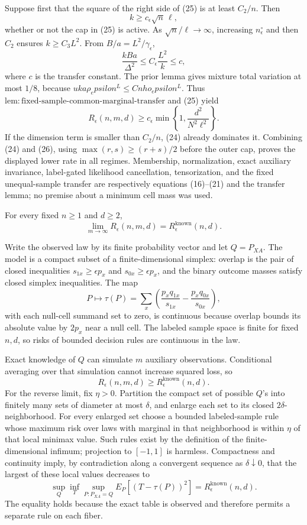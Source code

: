 Suppose first that the square of the right side of (25) is at least \(C_2/n\).  Then
\[
 k\ge c_\epsilon\sqrt n\,\ell,
\]
whether or not the cap in (25) is active.  As \(\sqrt n/\ell\to\infty\), increasing \(n_\epsilon^\circ\) and then \(C_2\) ensures \(k\ge C_3L^2\).  From \(B/a=L^2/\gamma_\epsilon\),
\[
 \frac{kBa}{\Delta^2}\le C_\epsilon\frac{L^2}{k}\le c,
\]
where \(c\) is the transfer constant.  The prior lemma gives mixture total variation at most \(1/8\), because \(uka\rho_epsilon^L\le Cn
ho_epsilon^L\).  Thus \(\mathrm{lem:fixed\mbox{-}sample\mbox{-}common\mbox{-}marginal\mbox{-}transfer}\) and (25) yield
\[
 R_\epsilon(n,m,d)\ge c_\epsilon\min\!\left\{1,\frac{d^2}{N^2\ell^2}\right\}. \tag{26}
\]
If the dimension term is smaller than \(C_2/n\), (24) already dominates it.  Combining (24) and (26), using \(\max(r,s)\ge(r+s)/2\) before the outer cap, proves the displayed lower rate in all regimes.  Membership, normalization, exact auxiliary invariance, label-gated likelihood cancellation, tensorization, and the fixed unequal-sample transfer are respectively equations (16)--(21) and the transfer lemma; no premise about a minimum cell mass was used.

For every fixed \(n\ge1\) and \(d\ge2\),
\[
 \lim_{m\to\infty}R_\epsilon(n,m,d)=R_\epsilon^{\mathrm{known}}(n,d).
\]

Write the observed law by its finite probability vector and let \(Q=P_{XA}\).  The model is a compact subset of a finite-dimensional simplex: overlap is the pair of closed inequalities \(s_{1x}\ge\epsilon p_x\) and \(s_{0x}\ge\epsilon p_x\), and the binary outcome masses satisfy closed simplex inequalities.  The map
\[
 P\longmapsto\tau(P)=\sum_x\left(\frac{p_xq_{1x}}{s_{1x}}-\frac{p_xq_{0x}}{s_{0x}}\right),
\]
with each null-cell summand set to zero, is continuous because overlap bounds its absolute value by \(2p_x\) near a null cell.  The labeled sample space is finite for fixed \(n,d\), so risks of bounded decision rules are continuous in the law.

Exact knowledge of \(Q\) can simulate \(m\) auxiliary observations.  Conditional averaging over that simulation cannot increase squared loss, so
\[
 R_\epsilon(n,m,d)\ge R_\epsilon^{\mathrm{known}}(n,d). \tag{27}
\]
For the reverse limit, fix \(\eta>0\).  Partition the compact set of possible \(Q\)'s into finitely many sets of diameter at most \(\delta\), and enlarge each set to its closed \(2\delta\)-neighborhood.  For every enlarged set choose a bounded labeled-sample rule whose maximum risk over laws with marginal in that neighborhood is within \(\eta\) of that local minimax value.  Such rules exist by the definition of the finite-dimensional infimum; projection to \([-1,1]\) is harmless.  Compactness and continuity imply, by contradiction along a convergent sequence as \(\delta\downarrow0\), that the largest of these local values decreases to
\[
 \sup_Q\inf_T\sup_{P:P_{XA}=Q}E_P[(T-\tau(P))^2]
 =R_\epsilon^{\mathrm{known}}(n,d). \tag{28}
\]
The equality holds because the exact table is observed and therefore permits a separate rule on each fiber.

